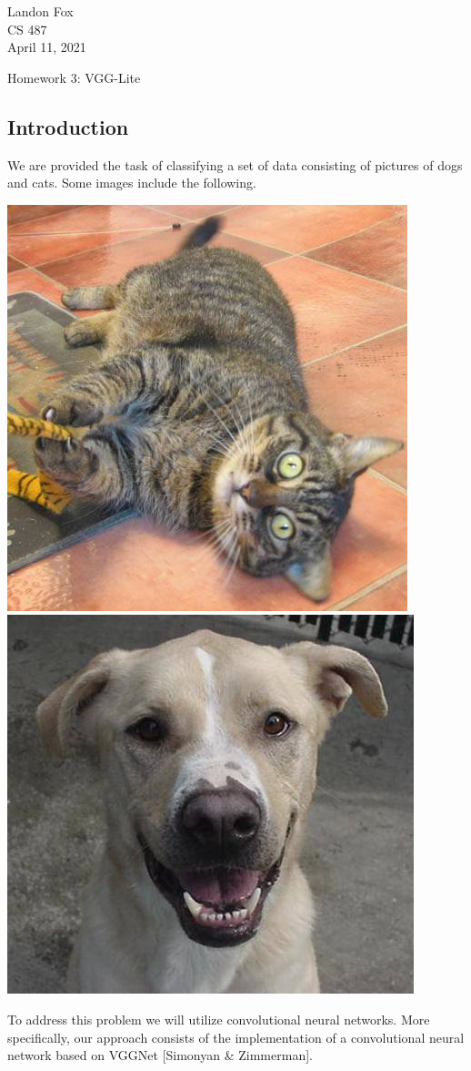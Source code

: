\documentclass[ 12pt ]{article}
\begin{document}
\noindent Landon Fox \\
\noindent CS 487 \\
\noindent April 11, 2021

\begin{center}
	\Large Homework 3: VGG-Lite
\end{center}

\subsection*{Introduction}

We are provided the task of classifying a set of data consisting of pictures of dogs and cats. Some images include the following.
\begin{center}
	\includegraphics[scale=0.35]{cat.836}
	\includegraphics[scale=0.35]{dog.722}
\end{center}
To address this problem we will utilize convolutional neural networks. More specifically, our approach consists of the implementation of a convolutional neural network based on VGGNet
[Simonyan \& Zimmerman].
\end{document}
